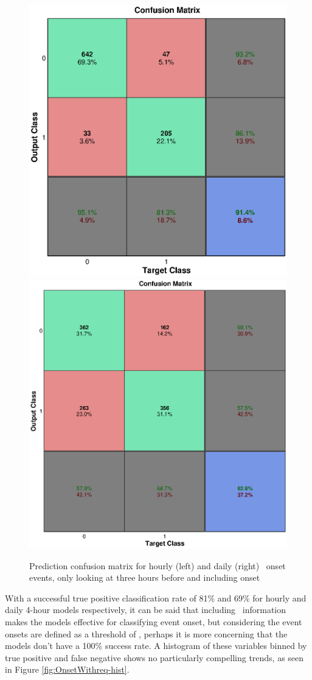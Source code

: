 \begin{figure}[htp!]
	\centering
	\includegraphics[width=0.45\linewidth]{Figures/CH5/NNBinaryOnset-hourly-withreq.eps}
	\includegraphics[width=0.45\linewidth]{Figures/CH5/NNBinaryOnset-daily-withreq.eps}
	\caption{Prediction confusion matrix for hourly (left) and daily (right) \req\ onset events, only looking at three hours before and including onset}
	\label{fig:OnsetWithreq}
\end{figure}

With a successful true positive classification rate of 81\% and 69\% for hourly and daily 4-hour models respectively, it can be said that including \req\ information makes the models effective for classifying event onset, but considering the event onsets are defined as a threshold of \req, perhaps it is more concerning that the models don't have a 100\% success rate. A histogram of these variables binned by true positive and false negative shows no particularly compelling trends, as seen in Figure \ref{fig:OnsetWithreq-hist}.


